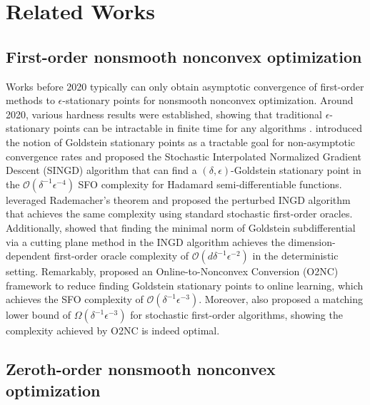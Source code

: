 \documentclass{article}
\def\gO{{\mathcal{O}}}
\theoremstyle{definition}
\theoremstyle{remark}
\begin{document}
	\section{Related Works}
	
	\subsection{First-order nonsmooth nonconvex optimization}
	
	Works before 2020 typically can only obtain asymptotic convergence of first-order methods to 
	$\epsilon$-stationary points
	\citep{benaim2005stochastic,kiwiel2007convergence,majewski2018analysis,davis2020stochastic,bolte2021conservative} for nonsmooth nonconvex optimization. Around 2020, various hardness results were established, showing that traditional 
	$\epsilon$-stationary points can be intractable in finite time for any algorithms \citep{zhang2020complexity,jordan2023deterministic,kornowski2022oracle,tian2021hardness}. 
	\citet{zhang2020complexity} introduced the notion of Goldstein stationary points as a tractable goal for non-asymptotic convergence rates 
	and proposed the Stochastic Interpolated Normalized Gradient Descent (SINGD) algorithm that can find a $(\delta,\epsilon)$-Goldstein stationary point in the $\gO(\delta^{-1} \epsilon^{-4})$ SFO complexity for Hadamard semi-differentiable functions. \citet{tian2022finite,davis2022gradient} leveraged Rademacher's theorem and proposed the perturbed INGD algorithm
	that achieves the same complexity using standard stochastic first-order oracles. Additionally, \citet{davis2022gradient} showed that finding the minimal norm of Goldstein subdifferential via a cutting plane method in the INGD algorithm \citep{zhang2020complexity} achieves the dimension-dependent first-order oracle complexity of $\gO(d \delta^{-1} \epsilon^{-2})$ in the deterministic setting. Remarkably, \citet{cutkosky2023optimal} proposed an Online-to-Nonconvex Conversion (O2NC) framework to reduce finding Goldstein stationary points to online learning, which achieves the SFO complexity of $\gO(\delta^{-1} \epsilon^{-3})$. Moreover, \citet{cutkosky2023optimal} also proposed a matching lower bound of $\Omega(\delta^{-1} \epsilon^{-3})$ for stochastic first-order algorithms, showing the complexity achieved by O2NC is indeed optimal.
	
	\subsection{Zeroth-order nonsmooth nonconvex optimization}
	
\end{document}
